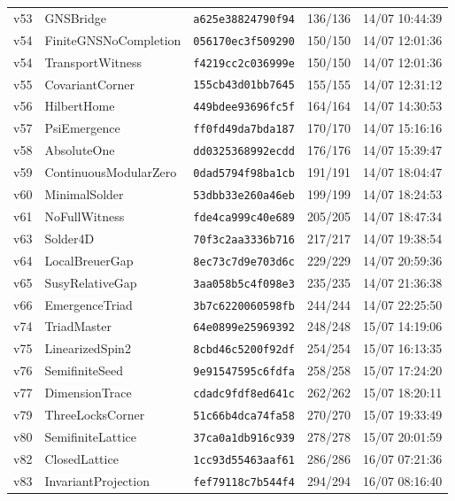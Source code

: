 \documentclass[11pt]{article}
\theoremstyle{definition}\newtheorem{deriv}{Derivação}
\begin{document}
{\begin{longtable}{@{}lllll@{}}
v53 & GNSBridge & \texttt{a625e38824790f94} & 136/136 & 14/07 10:44:39 \\
v54 & FiniteGNSNoCompletion & \texttt{056170ec3f509290} & 150/150 & 14/07 12:01:36 \\
v54 & TransportWitness & \texttt{f4219cc2c036999e} & 150/150 & 14/07 12:01:36 \\
v55 & CovariantCorner & \texttt{155cb43d01bb7645} & 155/155 & 14/07 12:31:12 \\
v56 & HilbertHome & \texttt{449bdee93696fc5f} & 164/164 & 14/07 14:30:53 \\
v57 & PsiEmergence & \texttt{ff0fd49da7bda187} & 170/170 & 14/07 15:16:16 \\
v58 & AbsoluteOne & \texttt{dd0325368992ecdd} & 176/176 & 14/07 15:39:47 \\
v59 & ContinuousModularZero & \texttt{0dad5794f98ba1cb} & 191/191 & 14/07 18:04:47 \\
v60 & MinimalSolder & \texttt{53dbb33e260a46eb} & 199/199 & 14/07 18:24:53 \\
v61 & NoFullWitness & \texttt{fde4ca999c40e689} & 205/205 & 14/07 18:47:34 \\
v63 & Solder4D & \texttt{70f3c2aa3336b716} & 217/217 & 14/07 19:38:54 \\
v64 & LocalBreuerGap & \texttt{8ec73c7d9e703d6c} & 229/229 & 14/07 20:59:36 \\
v65 & SusyRelativeGap & \texttt{3aa058b5c4f098e3} & 235/235 & 14/07 21:36:38 \\
v66 & EmergenceTriad & \texttt{3b7c6220060598fb} & 244/244 & 14/07 22:25:50 \\
v74 & TriadMaster & \texttt{64e0899e25969392} & 248/248 & 15/07 14:19:06 \\
v75 & LinearizedSpin2 & \texttt{8cbd46c5200f92df} & 254/254 & 15/07 16:13:35 \\
v76 & SemifiniteSeed & \texttt{9e91547595c6fdfa} & 258/258 & 15/07 17:24:20 \\
v77 & DimensionTrace & \texttt{cdadc9fdf8ed641c} & 262/262 & 15/07 18:20:11 \\
v79 & ThreeLocksCorner & \texttt{51c66b4dca74fa58} & 270/270 & 15/07 19:33:49 \\
v80 & SemifiniteLattice & \texttt{37ca0a1db916c939} & 278/278 & 15/07 20:01:59 \\
v82 & ClosedLattice & \texttt{1cc93d55463aaf61} & 286/286 & 16/07 07:21:36 \\
v83 & InvariantProjection & \texttt{fef79118c7b544f4} & 294/294 & 16/07 08:16:40 \\

\end{longtable}}
\end{document}
